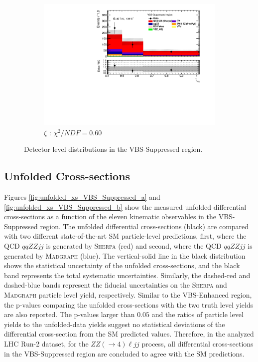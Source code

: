 \begin{figure}[!htb]
\begin{subfigure}{.49\textwidth}
        \includegraphics[width=.98\linewidth]{figures/Results/RecoDist_VBSSuppressed/reco_centrality_CR.pdf}
        \caption{ \footnotesize{$\zeta$ }: $\chi^2/NDF = 0.60$ }
    \end{subfigure}
    \caption{Detector level distributions in the VBS-Suppressed region.}  \label{fig:reco_VBS_Suppressed_b}
\end{figure}

\subsection{Unfolded Cross-sections}
\label{appendix:VBSSupUnfolded}

Figures \ref{fig:unfolded_xs_VBS_Suppressed_a} and \ref{fig:unfolded_xs_VBS_Suppressed_b} show the measured unfolded differential cross-sections as a function of the eleven kinematic observables in the VBS-Suppressed region. The unfolded differential cross-sections (black) are compared with two different state-of-the-art SM particle-level predictions, first, where the QCD $qqZZjj$ is generated by \textsc{Sherpa} (red) and second, where the QCD $qqZZjj$ is generated by \textsc{Madgraph} (blue). The vertical-solid line in the black distribution shows the statistical uncertainty of the unfolded cross-sections, and the black band represents the total systematic uncertainties. Similarly, the dashed-red and dashed-blue bands represent the fiducial uncertainties on the \textsc{Sherpa} and \textsc{Madgraph} particle level yield, respectively. Similar to the VBS-Enhanced region, the p-values comparing the unfolded cross-sections with the two truth level yields are also reported. The p-values larger than $0.05$ and the ratios of particle level yields to the unfolded-data yields suggest no statistical deviations of the differential cross-section from the SM predicted values. Therefore, in the analyzed LHC Run-2 dataset, for the $ZZ (\rightarrow 4) \ell jj$ process, all differential cross-sections in the VBS-Suppressed region are concluded to agree with the SM predictions. 

